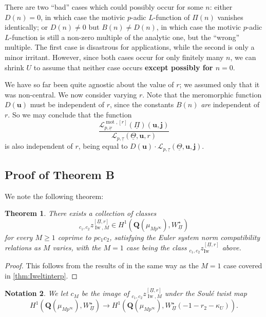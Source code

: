 \documentclass[cjm]{ipart}
\theoremstyle{plain}
\newtheorem{theorem}{Theorem}[subsection]
\newtheorem{notation}[theorem]{Notation}
\theoremstyle{remark}
\DeclareMathOperator{\Iw}{Iw}
\DeclareMathOperator{\mot}{mot}
\newcommand{\QQ}{\mathbf{Q}}
\newcommand{\bfj}{\mathbf{j}}
\newcommand{\cL}{\mathcal{L}}
\newcommand{\uPi}{\underline{\Pi}}
\newcommand{\uTh}{\underline{\Theta}}
\newcommand{\unu}{\underline{\nu}}
\newcommand{\utau}{\underline{\tau}}
\numberwithin{equation}{subsection}
\renewcommand{\ge}{\geqslant}
\begin{document}
  \begin{remark}
   There are two ``bad'' cases which could possibly occur for some $n$: either $D(n) = 0$, in which case the motivic $p$-adic $L$-function of $\Pi(n)$ vanishes identically; or $D(n) \ne 0$ but $B(n)\ne D(n)$, in which case the motivic $p$-adic $L$-function is still a non-zero multiple of the analytic one, but the ``wrong'' multiple. The first case is disastrous for applications, while the second is only a minor irritant. However, since both cases occur for only finitely many $n$, we can shrink $U$ to assume that neither case occurs \textbf{except possibly for $n = 0$}.
  \end{remark}

  We have so far been quite agnostic about the value of $r$; we assumed only that it was non-central. We now consider varying $r$. Note that the meromorphic function $D(\mathbf{u})$ must be independent of $r$, since the constants $B(n)$ \emph{are} independent of $r$. So we may conclude that the function
  \[
   \frac{\cL_{p,\unu}^{\mot, [r]}(\uPi)(\mathbf{u}, \bfj)}{\cL_{p, \utau}(\uTh, \mathbf{u},r)}
  \]
  is also independent of $r$, being equal to $D(\mathbf{u})\cdot  \cL_{p, \utau}(\uTh, \mathbf{u}, \bfj)$.


 \subsection{Proof of Theorem B}

  We note the following theorem:

  \begin{theorem}
   There exists a collection of classes
   \[
   {}_{c_1, c_2} z^{[\uPi, r]}_{\Iw, M} \in H^1(\QQ(\mu_{Mp^\infty}), W_{\uPi}^\star)
   \]
   for every $M \ge 1$ coprime to $pc_1 c_2$, satisfying the Euler system norm compatibility relations as $M$ varies, with the $M = 1$ case being the class ${}_{c_1, c_2} z^{[\uPi, r]}_{\Iw}$ above.
  \end{theorem}

  \begin{proof}
   This follows from the results of \cite{LSZ17} in the same way as the $M = 1$ case covered in \cref{thm:Iweltinterp}.
  \end{proof}

  \begin{notation}
   We let $c_M$ be the image of ${}_{c_1, c_2} z^{[\uPi, r]}_{\Iw, M}$ under the Soul\'e twist map
   \[ H^1(\QQ(\mu_{Mp^\infty}), W_{\uPi}^\star) \to H^1(\QQ(\mu_{Mp^\infty}), W_{\uPi}^\star(-1-r_2-\kappa_U)).\]
  \end{notation}
\end{document}
